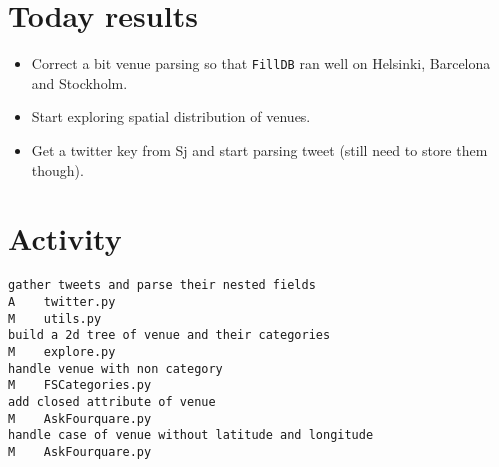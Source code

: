 \section*{Today results}
\begin{itemize}
	\item Correct a bit venue parsing so that \texttt{FillDB} ran well on
		Helsinki, Barcelona and Stockholm.
	\item Start exploring spatial distribution of venues.
	\item Get a twitter key from Sj and start parsing tweet (still need to
		store them though).
\end{itemize}

\section*{Activity}
\begin{verbatim}
gather tweets and parse their nested fields
A    twitter.py
M    utils.py
build a 2d tree of venue and their categories
M    explore.py
handle venue with non category
M    FSCategories.py
add closed attribute of venue
M    AskFourquare.py
handle case of venue without latitude and longitude
M    AskFourquare.py
\end{verbatim}
